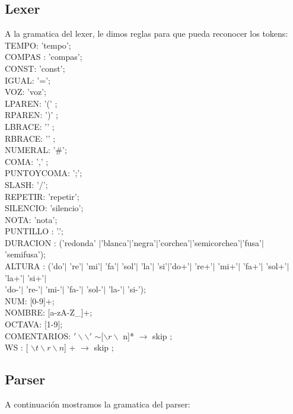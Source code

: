 \documentclass[a4paper]{article}
\begin{document}
\subsection{Lexer}
A la gramatica del lexer, le dimos reglas para que pueda reconocer los tokens:\\
TEMPO: 'tempo'; \\
COMPAS : 'compas'; \\
CONST: 'const';\\
IGUAL: '=';\\
VOZ: 'voz';\\
LPAREN: '(' ;\\
RPAREN: ')' ;\\
LBRACE: '{' ;\\
RBRACE: '}' ;\\
NUMERAL:  '\#';\\
COMA: ',' ;\\
PUNTOYCOMA: ';';\\
SLASH: '/';\\
REPETIR: 'repetir';\\
SILENCIO: 'silencio';\\
NOTA:  'nota';\\
PUNTILLO : '.';\\
DURACION : ('redonda' $|$'blanca'$|$'negra'$|$'corchea'$|$'semicorchea'$|$'fusa'$|$'semifusa');\\
ALTURA : ('do'$|$ 're'$|$ 'mi'$|$ 'fa'$|$ 'sol'$|$ 'la'$|$ 'si'$|$'do+'$|$ 're+'$|$ 'mi+'$|$ 'fa+'$|$ 'sol+'$|$ 'la+'$|$ 'si+'$|$\\
	'do-'$|$ 're-'$|$ 'mi-'$|$ 'fa-'$|$ 'sol-'$|$ 'la-'$|$ 'si-');\\
NUM: [0-9]+;\\
NOMBRE: $[$a-zA-Z\_$]$+;\\
OCTAVA: [1-9];\\
COMENTARIOS:   $'\backslash\backslash'$ $\sim$[$\backslash r \backslash$ n]*  $\rightarrow$ skip ;\\
WS : [ $\backslash t \backslash r \backslash n$] + $\rightarrow$ skip ;\\

\newpage

\subsection{Parser}
A continuación mostramos la gramatica del parser:\\
\end{document}

